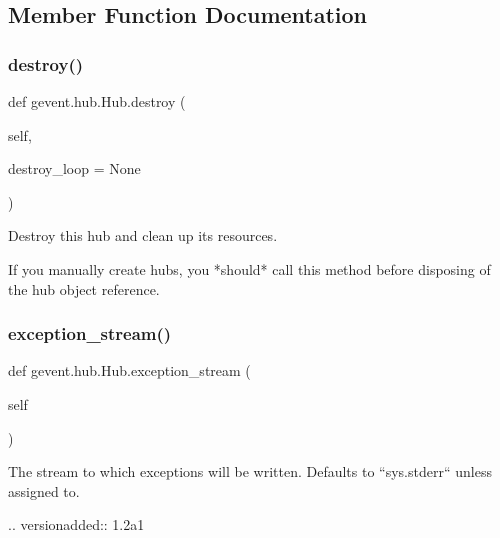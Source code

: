 \subsection{Member Function Documentation}
\mbox{\label{classgevent_1_1hub_1_1_hub_a878ff1369af9d48f9fd3e4b89e18c550}} 
\subsubsection{\texorpdfstring{destroy()}{destroy()}}
{\footnotesize\ttfamily def gevent.\+hub.\+Hub.\+destroy (\begin{DoxyParamCaption}\item[{}]{self,  }\item[{}]{destroy\+\_\+loop = {\ttfamily None} }\end{DoxyParamCaption})}

\begin{DoxyVerb}Destroy this hub and clean up its resources.

If you manually create hubs, you *should* call this
method before disposing of the hub object reference.
\end{DoxyVerb}
 \mbox{\label{classgevent_1_1hub_1_1_hub_a6dc448d76b7697b10aaba0f789872b15}} 
\subsubsection{\texorpdfstring{exception\+\_\+stream()}{exception\_stream()}}
{\footnotesize\ttfamily def gevent.\+hub.\+Hub.\+exception\+\_\+stream (\begin{DoxyParamCaption}\item[{}]{self }\end{DoxyParamCaption})}

\begin{DoxyVerb}The stream to which exceptions will be written.
Defaults to ``sys.stderr`` unless assigned to.

.. versionadded:: 1.2a1
\end{DoxyVerb}
 \mbox{\label{classgevent_1_1hub_1_1_hub_ac78de5705d8cf4faa04225a38f7759b5}} 
